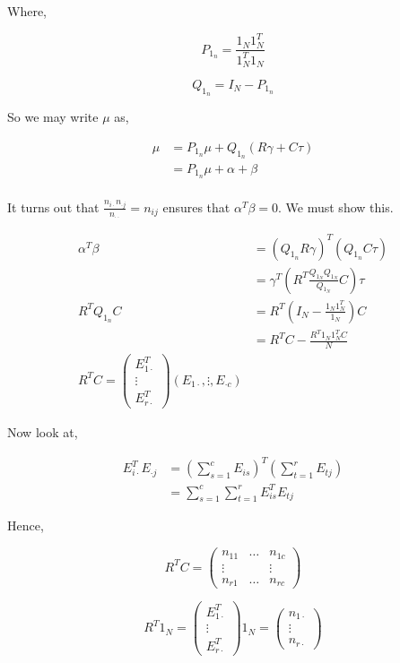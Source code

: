 \documentclass[11pt,fleqn]{book} %
\begin{document}
Where, 

		$$P_{1_n} = \frac{1_N 1_N^T}{1_N^T 1_N} $$

		$$Q_{1_n} = I_N - P_{1_n} $$

So we may write $\mu$ as, 

	\begin{align*}
		 \mu &= P_{1_n} \mu + Q_{1_n}(R\gamma + C\tau)\\
		 		&= P_{1_n}\mu + \alpha + \beta\\
	\end{align*}

It turns out that $\frac{n_{i\cdot} n_{\cdot j}}{n_{\cdot \cdot}} = n_{ij}$ ensures that $\alpha^T\beta = 0$. We must show this. 


		\begin{align*}
			\alpha^T\beta &= (Q_{1_n}R\gamma)^T(Q_{1_n} C \tau)\\
				&= \gamma^T (R^T \frac{Q_{1_N}Q_{1_N}}{Q_{1_N}} C ) \tau\\
			R^T Q_{1_n} C &= R^T (I_N - \frac{1_N 1_N^T}{1_N}) C \\
				&= R^T C  - \frac{R^T 1_N 1_N^T C}{N}\\
			R^T C = \begin{pmatrix}
				E_{1 \cdot}^T\\
				\vdots\\
				E_{r \cdot}^T
			\end{pmatrix} (E_{1 \cdot}, \vdots,	E_{ \cdot c})	
		\end{align*}


Now look at, 

		\begin{align*}
			E_{i \cdot}^T E_{\cdot j} &= \left( \sum^c_{s=1} E_{is} \right)^T \left(\sum^r_{t=1} E_{tj} \right)\\
				&= \sum^c_{s=1} \sum^r_{t=1} E^T_{is} E_{tj}
		\end{align*}



Hence, 

		$$R^TC = \begin{pmatrix}
			n_{11}&  \dots &  n_{1c}\\
			\vdots & & \vdots\\
			n_{r1}  & \dots & n_{rc}
		\end{pmatrix} $$
 
 		$$R^T 1_N = \begin{pmatrix}
 			E_{1 \cdot}^T\\
 			\vdots\\
 			E_{r\cdot}^T
 		\end{pmatrix} 1_N = \begin{pmatrix}
 			n_{1 \cdot}\\
 			\vdots\\
 			n_{r\cdot}
 		\end{pmatrix}$$
\end{document}
